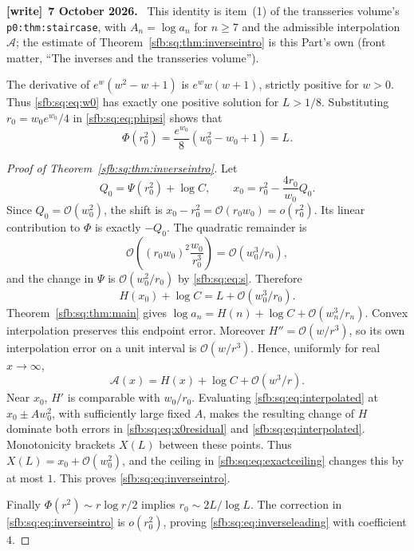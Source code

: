 \documentclass[11pt]{article}
\theoremstyle{remark}\newtheorem{remark}[theorem]{Remark}
\newcommand{\OO}{\mathcal O}
\newcommand{\file}[1]{\nolinkurl{#1}}
\newenvironment{writenote}[1][]{\par\smallskip\begingroup\small
 \noindent\textbf{[write]}\if\relax\detokenize{#1}\relax\else~\textbf{#1.}\fi\ }%
 {\par\endgroup\smallskip}
\begin{document}
\begin{writenote}[7 October 2026]
This identity is item~(1) of the transseries volume's \file{p0:thm:staircase}, with $A_n=\log a_n$ for $n\ge7$ and the admissible interpolation $\mathcal A$; the estimate of Theorem~\ref{sfb:sq:thm:inverseintro} is this Part's own (front matter, ``The inverses and the transseries volume'').
\end{writenote}

The derivative of $e^w(w^2-w+1)$ is $e^w w(w+1)$, strictly positive for $w>0$. Thus \eqref{sfb:sq:eq:w0} has exactly one positive solution for $L>1/8$. Substituting $r_0=w_0e^{w_0}/4$ in \eqref{sfb:sq:eq:phipsi} shows that
\begin{equation}\label{sfb:sq:eq:Phiinverse}
 \Phi(r_0^2)=\frac{e^{w_0}}8(w_0^2-w_0+1)=L.
\end{equation}

\begin{proof}[Proof of Theorem~\ref{sfb:sq:thm:inverseintro}]
Let
\begin{equation}\label{sfb:sq:eq:x0}
 Q_0=\Psi(r_0^2)+\log C,\qquad
 x_0=r_0^2-\frac{4r_0}{w_0}Q_0.
\end{equation}
Since $Q_0=\OO(w_0^2)$, the shift is $x_0-r_0^2=\OO(r_0w_0)=o(r_0^2)$. Its linear contribution to $\Phi$ is exactly $-Q_0$. The quadratic remainder is
\[
 \OO\!\left((r_0w_0)^2\frac{w_0}{r_0^3}\right)
 =\OO(w_0^3/r_0),
\]
and the change in $\Psi$ is $\OO(w_0^2/r_0)$ by \eqref{sfb:sq:eq:s}. Therefore
\begin{equation}\label{sfb:sq:eq:x0residual}
 H(x_0)+\log C=L+\OO(w_0^3/r_0).
\end{equation}
Theorem~\ref{sfb:sq:thm:main} gives
$\log a_n=H(n)+\log C+\OO(w_n^3/r_n)$. Convex interpolation preserves this endpoint error. Moreover $H''=\OO(w/r^3)$, so its own interpolation error on a unit interval is $\OO(w/r^3)$. Hence, uniformly for real $x\to\infty$,
\begin{equation}\label{sfb:sq:eq:interpolated}
 \mathcal A(x)=H(x)+\log C+\OO(w^3/r).
\end{equation}
Near $x_0$, $H'$ is comparable with $w_0/r_0$. Evaluating \eqref{sfb:sq:eq:interpolated} at $x_0\pm A w_0^2$, with sufficiently large fixed $A$, makes the resulting change of $H$ dominate both errors in \eqref{sfb:sq:eq:x0residual} and \eqref{sfb:sq:eq:interpolated}. Monotonicity brackets $X(L)$ between these points. Thus
$X(L)=x_0+\OO(w_0^2)$, and the ceiling in \eqref{sfb:sq:eq:exactceiling} changes this by at most $1$. This proves \eqref{sfb:sq:eq:inverseintro}.

Finally $\Phi(r^2)\sim r\log r/2$ implies
$r_0\sim2L/\log L$. The correction in \eqref{sfb:sq:eq:inverseintro} is $o(r_0^2)$, proving \eqref{sfb:sq:eq:inverseleading} with coefficient $4$.
\end{proof}
\end{document}
